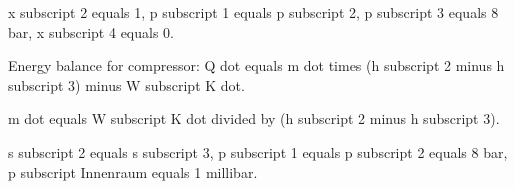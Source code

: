 x subscript 2 equals 1, p subscript 1 equals p subscript 2, p subscript 3 equals 8 bar, x subscript 4 equals 0.

Energy balance for compressor: Q dot equals m dot times (h subscript 2 minus h subscript 3) minus W subscript K dot.

m dot equals W subscript K dot divided by (h subscript 2 minus h subscript 3).

s subscript 2 equals s subscript 3, p subscript 1 equals p subscript 2 equals 8 bar, p subscript Innenraum equals 1 millibar.
